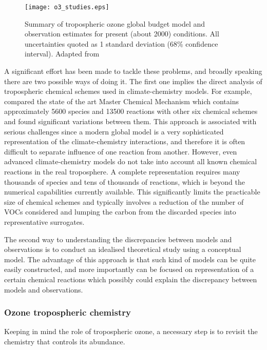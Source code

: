 \documentclass[11pt,a4paper]{article}
\begin{document}
\begin{figure}[t] %
\centering
\texttt{[image: o3\_studies.eps]}
\caption{Summary of tropospheric ozone global budget model and observation estimates for present (about 2000) conditions. All uncertainties quoted as 1 standard deviation (68\% confidence interval). Adapted from \citep{Myhre2013}}\label{fig:O3budget}
\end{figure}

A significant effort has been made to tackle these problems, and broadly speaking there are two possible ways of doing it. The first one implies the direct analysis of tropospheric chemical schemes used in climate-chemistry models. For example, \cite{Emmerson2009} compared the state of the art Master Chemical Mechanism which contains approximately 5600 species and 13500 reactions \citep{Jenkin2002} with other six chemical schemes and found significant variations between them. This approach is associated with serious challenges since a modern global model is a very sophisticated representation of the climate-chemistry interactions, and therefore it is often difficult to separate influence of one reaction from another. However, even advanced climate-chemistry models do not take into account all known chemical reactions in the real troposphere. A complete representation requires many thousands of species and tens of thousands of reactions, which is beyond the numerical capabilities currently available. This significantly limits the practicable size of chemical schemes and typically involves a reduction of the number of VOCs considered and lumping the carbon from the discarded species into representative surrogates.

The second way to understanding the discrepancies between models and observations is to conduct an idealised theoretical study using a conceptual model. The advantage of this approach is that such kind of models can be quite easily constructed, and more importantly can be focused on representation of a certain chemical reactions which possibly could explain the discrepancy between models and observations.

\subsubsection*{Ozone tropospheric chemistry}\label{intro_O3chem}
Keeping in mind the role of tropospheric ozone, a necessary step is to revisit the chemistry that controls its abundance.
\end{document}
